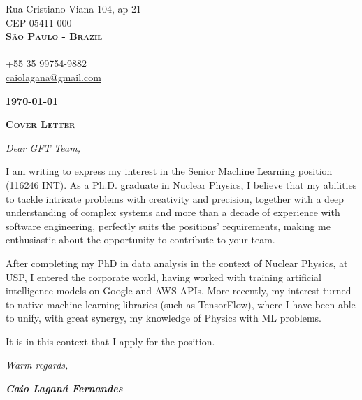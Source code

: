 \documentclass[twoside]{letter}
\begin{document}
\justifying

\parbox{\linewidth}
{
\begin{flushright}
Rua Cristiano Viana 104, ap 21\\
CEP 05411-000\\
\textbf{\textsc{São Paulo - Brazil}}\\
\mbox{}\\
+55 35 99754-9882\\
\href{mailto:caiolagana@gmail.com}{caiolagana@gmail.com}
\end{flushright}
}

\textbf{\today}


\vspace{2em}

\begin{center}\textsc{\Large \textbf{Cover Letter}}\end{center}

\emph{Dear GFT Team,}

I am writing to express my interest in the Senior Machine Learning position (116246 INT). As a Ph.D. graduate in Nuclear Physics, I believe that my abilities to tackle intricate problems with creativity and precision, together with a deep understanding of complex systems and more than a decade of experience with software engineering, perfectly suits the positions' requirements, making me enthusiastic about the opportunity to contribute to your team.

After completing my PhD in data analysis in the context of Nuclear Physics, at USP, I entered the corporate world, having worked with training artificial intelligence models on Google and AWS APIs. More recently, my interest turned to native machine learning libraries (such as TensorFlow), where I have been able to unify, with great synergy, my knowledge of Physics with ML problems.

It is in this context that I apply for the position.

\bigskip

\emph{Warm regards,}

\vfill

    \parbox{\linewidth}
    {
    \begin{flushright}
        \textbf{\emph{Caio Laganá Fernandes}}
    \end{flushright}
    }
\end{document}
